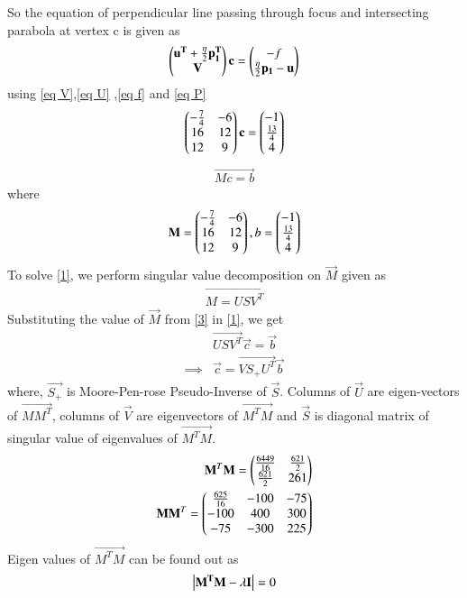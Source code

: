 \documentclass[journal,12pt,twocolumn]{IEEEtran}
\begin{document}
So the equation of perpendicular line passing through focus and intersecting parabola at vertex c is given as
\begin{align}
\begin{pmatrix}\mathbf{u^T}+\frac{\eta}{2}\mathbf{p_1^T} \\ \mathbf{V}\end{pmatrix}\mathbf{c}=
\begin{pmatrix}-f \\ \frac{\eta}{2}\mathbf{p_1}-\mathbf{u}\end{pmatrix} 
\end{align}
using \eqref{eq V},\eqref{eq U} ,\eqref{eq f} and \eqref{eq P}
\begin{align}
    \begin{pmatrix}-\frac{7}{4}& -6\\16 & 12 \\12 & 9\end{pmatrix}\mathbf{c}=\begin{pmatrix}-1 \\ \frac{13}{4}\\4\end{pmatrix} 
\end{align}
\begin{align}
\vec{Mc=b} \label{1}
\end{align}
where
\begin{align}
\mathbf{M} = \begin{pmatrix}-\frac{7}{4}& -6\\16 & 12 \\12 & 9\end{pmatrix},b = \begin{pmatrix}-1 \\ \frac{13}{4}\\4\end{pmatrix}\label{2}	
\end{align}
To solve \eqref{1}, we perform singular value decomposition on $\vec{M}$ given as 
\begin{align}
	\vec{M = USV^T }\label{3}
\end{align}
Substituting the value of $\vec{M}$ from \eqref{3} in \eqref{1}, we get
\begin{align}
	&\vec{USV^T}\vec{c} = \vec{b} \\
\implies& \vec{c} = \vec{VS_+U^T}\vec{b}\label{4}
\end{align}
where, $\vec{S_+}$ is Moore-Pen-rose Pseudo-Inverse of $\vec{S}$. Columns of $\vec{U}$ are eigen-vectors of $\vec{MM^T}$, columns of $\vec{V}$ are eigenvectors of $\vec{M^TM}$ and $\vec{S}$ is diagonal matrix of singular value of eigenvalues of $\vec{M^TM}$.
\begin{align}
\mathbf{M}^T\mathbf{M}=\begin{pmatrix}\frac{6449}{16}&\frac{621}{2}\\\frac{621}{2}&261\end{pmatrix}\label{eqMTM}\\
\mathbf{M}\mathbf{M}^T=\begin{pmatrix}\frac{625}{16}&-100&-75\\-100&400&300\\-75&-300&225\end{pmatrix}
\end{align}
Eigen values of $\vec{M^TM}$ can be found out as
\begin{align}
	 \left\vert\mathbf{M^TM-\lambda I}\right\vert = 0
\end{align}
\end{document}
